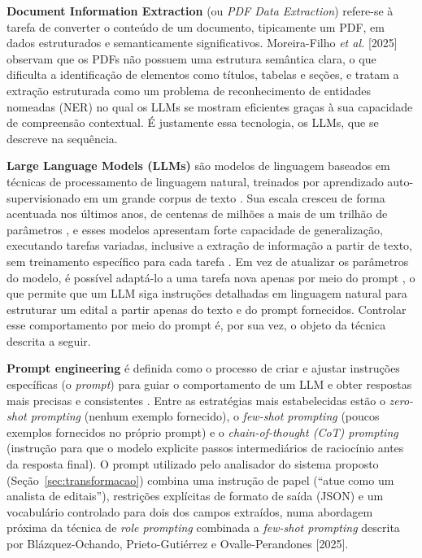 \documentclass[12pt]{article}
\begin{document}
  \textbf{Document Information Extraction} (ou \emph{PDF Data Extraction}) refere-se à tarefa de converter o conteúdo de um documento, tipicamente um PDF, em dados estruturados e semanticamente significativos. Moreira-Filho \emph{et al.} [2025] observam que os PDFs não possuem uma estrutura semântica clara, o que dificulta a identificação de elementos como títulos, tabelas e seções, e tratam a extração estruturada como um problema de reconhecimento de entidades nomeadas (NER) no qual os LLMs se mostram eficientes graças à sua capacidade de compreensão contextual. É justamente essa tecnologia, os LLMs, que se descreve na sequência.

  \textbf{Large Language Models (LLMs)} são modelos de linguagem baseados em técnicas de processamento de linguagem natural, treinados por aprendizado auto-supervisionado em um grande corpus de texto \cite{b7}. Sua escala cresceu de forma acentuada nos últimos anos, de centenas de milhões a mais de um trilhão de parâmetros \cite{b7}, e esses modelos apresentam forte capacidade de generalização, executando tarefas variadas, inclusive a extração de informação a partir de texto, sem treinamento específico para cada tarefa \cite{b7}. Em vez de atualizar os parâmetros do modelo, é possível adaptá-lo a uma tarefa nova apenas por meio do prompt \cite{b5}, o que permite que um LLM siga instruções detalhadas em linguagem natural para estruturar um edital a partir apenas do texto e do prompt fornecidos. Controlar esse comportamento por meio do prompt é, por sua vez, o objeto da técnica descrita a seguir.

  \textbf{Prompt engineering} é definida como o processo de criar e ajustar instruções específicas (o \emph{prompt}) para guiar o comportamento de um LLM e obter respostas mais precisas e consistentes \cite{b5,b1}. Entre as estratégias mais estabelecidas estão o \emph{zero-shot prompting} (nenhum exemplo fornecido), o \emph{few-shot prompting} (poucos exemplos fornecidos no próprio prompt) e o \emph{chain-of-thought (CoT) prompting} (instrução para que o modelo explicite passos intermediários de raciocínio antes da resposta final). O prompt utilizado pelo analisador do sistema proposto (Seção~\ref{sec:transformacao}) combina uma instrução de papel (``atue como um analista de editais''), restrições explícitas de formato de saída (JSON) e um vocabulário controlado para dois dos campos extraídos, numa abordagem próxima da técnica de \emph{role prompting} combinada a \emph{few-shot prompting} descrita por Blázquez-Ochando, Prieto-Gutiérrez e Ovalle-Perandones [2025].
\end{document}
